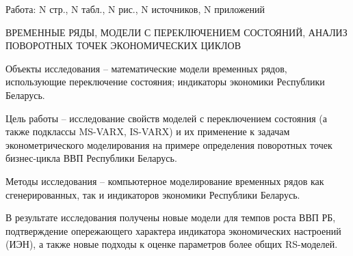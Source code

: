 \documentclass[a4paper,14pt]{extreport}
\begin{document}







Работа: N стр., N табл., N рис., N источников, N приложений

\MakeUppercase{временные ряды, модели с переключением состояний, анализ поворотных точек экономических циклов}

Объекты исследования -- математические модели временных рядов, использующие переключение состояния; индикаторы экономики Республики Беларусь.

Цель работы -- исследование свойств моделей с переключением состояния (а также подклассы MS-VARX, IS-VARX) и их применение к задачам эконометрического моделирования на примере определения поворотных точек бизнес-цикла ВВП Республики Беларусь.

Методы исследования -- компьютерное моделирование временных рядов как сгенерированных, так и индикаторов экономики Республики Беларусь.

В результате исследования получены новые модели для темпов роста ВВП РБ, подтверждение опережающего характера индикатора экономических настроений (ИЭН), а также новые подходы к оценке параметров более общих RS-моделей.



\clearpage
\renewcommand{\contentsname}{Содержание}
\tableofcontents


\end{document}
